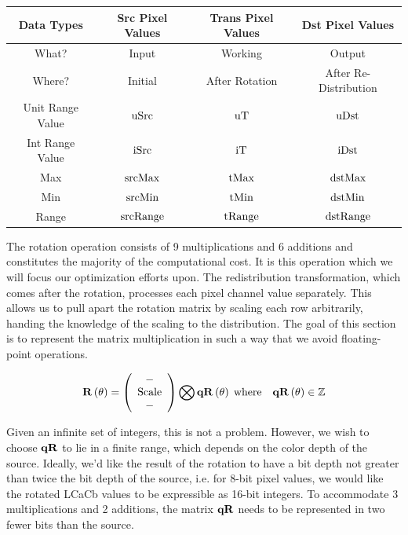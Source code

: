 \begin{tabular}{|c|c|c|c|}
  \hline
     Data Types & Src Pixel Values & Trans Pixel Values & Dst Pixel Values \\ \hline
  What? & Input & Working & Output \\ \hline
  Where? & Initial & After Rotation & After Re-Distribution \\ \hline
  Unit Range Value & $ \text{uSrc} $ & $\text{uT}$ & $\text{uDst}$ \\ \cline{1-1}
  Int Range Value & $\text{iSrc}$ & $\text{iT}$ & $\text{iDst}$ \\ \cline{1-1}
  Max & $\text{srcMax}$ & $\text{tMax}$ & $\text{dstMax}$ \\ \cline{1-1}
  Min & $\text{srcMin}$ & $\text{tMin}$ & $\text{dstMin}$ \\ \cline{1-1}
  Range & $\text{srcRange}$ & $\text{tRange}$ & $\text{dstRange}$ \\
  \hline
\end{tabular}

The rotation operation consists of 9 multiplications and 6 additions and constitutes the majority of the computational cost. It is this operation which we will focus our optimization efforts upon. The redistribution transformation, which comes after the rotation, processes each pixel channel value separately. This allows us to pull apart the rotation matrix by scaling each row arbitrarily, handing the knowledge of the scaling to the distribution. The goal of this section is to represent the matrix multiplication in such a way that we avoid floating-point operations.

\begin{equation}\label{eq:NormRxyz4}
 \R[\theta] =
\left(
\begin{array}{c}
 -  \\
 \text{Scale} \\
 -  \\
\end{array}
\right)
\bigotimes
\qR[\theta]\;\text{where}\quad{\qR[\theta]\in\mathbb{Z}}
\end{equation}

Given an infinite set of integers, this is not a problem. However, we wish to choose $\qR$ to lie in a finite range, which depends on the color depth of the source. Ideally, we'd like the result of the rotation to have a bit depth not greater than twice the bit depth of the source, i.e. for 8-bit pixel values, we would like the rotated LCaCb values to be expressible as 16-bit integers. To accommodate 3 multiplications and 2 additions, the matrix $\qR$ needs to be represented in two fewer bits than the source.

